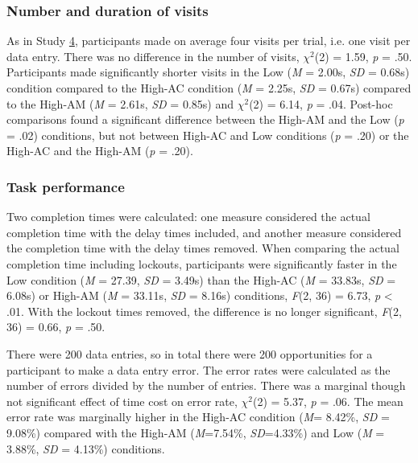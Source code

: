\subsubsection{Number and duration of visits}
As in Study \hyperref[st:Study4]{4}, participants made on average four visits per trial, i.e. one visit per data entry. There was no difference in the number of visits, $\chi^2$(2) = 1.59, \textit{p} = .50. Participants made significantly shorter visits in the Low (\textit{M} = 2.00s, \textit{SD} = 0.68s) condition compared to the High-AC condition (\textit{M} = 2.25s, \textit{SD} = 0.67s) compared to the High-AM (\textit{M} = 2.61s, \textit{SD} = 0.85s) and  $\chi^2$(2) = 6.14, \textit{p} = .04. Post-hoc comparisons found a significant difference between  the High-AM and the Low (\textit{p} = .02) conditions, but not between High-AC and Low conditions (\textit{p} = .20) or the High-AC and the High-AM (\textit{p} = .20).

\subsubsection{Task performance}
Two completion times were calculated: one measure considered the actual completion time with the delay times included, and another measure considered the completion time with the delay times removed. When comparing the actual completion time including lockouts, participants were significantly faster in the Low condition (\textit{M} = 27.39, \textit{SD} = 3.49s) than the High-AC (\textit{M} = 33.83s, \textit{SD} = 6.08s) or High-AM (\textit{M} = 33.11s, \textit{SD} = 8.16s) conditions, \textit{F}(2, 36) = 6.73, \textit{p} < .01. With the lockout times removed, the difference is no longer significant, \textit{F}(2, 36) = 0.66, \textit{p} = .50.

There were 200 data entries, so in total there were 200 opportunities for a participant to make a data entry error. The error rates were calculated as the number of errors divided by the number of entries. There was a marginal though not significant effect of time cost on error rate, $\chi^2$(2) = 5.37, \textit{p} = .06. The mean error rate was marginally higher in the High-AC condition (\textit{M}= 8.42\%, \textit{SD} = 9.08\%) compared with the High-AM (\textit{M}=7.54\%, \textit{SD}=4.33\%) and Low (\textit{M} = 3.88\%, \textit{SD} = 4.13\%) conditions. 


